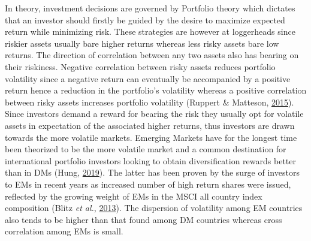\documentclass[11pt,preprint, authoryear]{elsarticle}
\numberwithin{equation}{section}
\numberwithin{figure}{section}
\numberwithin{table}{section}
\begin{document}
In theory, investment decisions are governed by Portfolio theory which
dictates that an investor should firstly be guided by the desire to
maximize expected return while minimizing risk. These strategies are
however at loggerheads since riskier assets usually bare higher returns
whereas less risky assets bare low returns. The direction of correlation
between any two assets also has bearing on their riskiness. Negative
correlation between risky assets reduces portfolio volatility since a
negative return can eventually be accompanied by a positive return hence
a reduction in the portfolio's volatility whereas a positive correlation
between risky assets increases portfolio volatility (Ruppert \&
Matteson, \protect\hyperlink{ref-ruppert2015}{2015}). Since investors
demand a reward for bearing the risk they usually opt for volatile
assets in expectation of the associated higher returns, thus investors
are drawn towards the more volatile markets. Emerging Markets have for
the longest time been theorized to be the more volatile market and a
common destination for international portfolio investors looking to
obtain diversification rewards better than in DMs (Hung,
\protect\hyperlink{ref-hung2019}{2019}). The latter has been proven by
the surge of investors to EMs in recent years as increased number of
high return shares were issued, reflected by the growing weight of EMs
in the MSCI all country index composition (Blitz \emph{et al.},
\protect\hyperlink{ref-blitz2013}{2013}). The dispersion of volatility
among EM countries also tends to be higher than that found among DM
countries whereas cross correlation among EMs is small.
\end{document}
